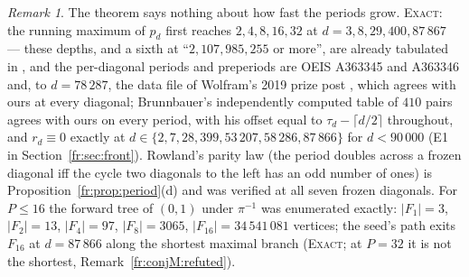 \documentclass[11pt]{article}
\theoremstyle{definition}
\theoremstyle{remark}
\newtheorem{remark}[theorem]{Remark}
\newcommand{\EXACT}{\textsc{Exact}}
\begin{document}
\begin{remark}
The theorem says nothing about how fast the periods grow. \EXACT: the running maximum of $p_d$ first reaches $2,4,8,16,32$ at $d=3,8,29,400,87\,867$ --- these depths, and a sixth at ``$2{,}107{,}985{,}255$ or more'', are already tabulated in \cite[p.~871]{NKS}, and the per-diagonal periods and preperiods are OEIS A363345 and A363346 \cite{A363346} and, to $d=78\,287$, the data file of Wolfram's 2019 prize post \cite{Wolfram19}, which agrees with ours at every diagonal; Brunnbauer's \cite{Brunnbauer} independently computed table of $410$ pairs agrees with ours on every period, with his offset equal to $\tau_d-\lceil d/2\rceil$ throughout, and $r_d\equiv0$ exactly at $d\in\{2,7,28,399,53\,207,58\,286,87\,866\}$ for $d<90\,000$ (E1 in Section~\ref{fr:sec:front}). Rowland's parity law \cite{Rowland} (the period doubles across a frozen diagonal iff the cycle two diagonals to the left has an odd number of ones) is Proposition~\ref{fr:prop:period}(d) and was verified at all seven frozen diagonals. For $P\le16$ the forward tree of $(0,1)$ under $\pi^{-1}$ was enumerated exactly: $|F_1|=3$, $|F_2|=13$, $|F_4|=97$, $|F_8|=3065$, $|F_{16}|=34\,541\,081$ vertices; the seed's path exits $F_{16}$ at $d=87\,866$ along the shortest maximal branch (\EXACT; at $P=32$ it is not the shortest, Remark~\ref{fr:conjM:refuted}).

\end{remark}
\end{document}
